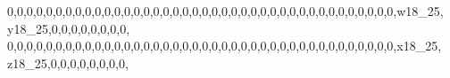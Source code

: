 \documentclass[]{article}
\newenvironment{Shaded}{\begin{snugshade}}{\end{snugshade}}
\newcommand{\DecValTok}[1]{\textcolor[rgb]{0.00,0.00,0.81}{#1}}
\newcommand{\NormalTok}[1]{#1}
\begin{document}
\begin{Shaded}
\begin{Highlighting}[]
\DecValTok{0}\NormalTok{,}\DecValTok{0}\NormalTok{,}\DecValTok{0}\NormalTok{,}\DecValTok{0}\NormalTok{,}\DecValTok{0}\NormalTok{,}\DecValTok{0}\NormalTok{,}\DecValTok{0}\NormalTok{,}\DecValTok{0}\NormalTok{,}\DecValTok{0}\NormalTok{,}\DecValTok{0}\NormalTok{,}\DecValTok{0}\NormalTok{,}\DecValTok{0}\NormalTok{,}\DecValTok{0}\NormalTok{,}\DecValTok{0}\NormalTok{,}\DecValTok{0}\NormalTok{,}\DecValTok{0}\NormalTok{,}\DecValTok{0}\NormalTok{,}\DecValTok{0}\NormalTok{,}\DecValTok{0}\NormalTok{,}\DecValTok{0}\NormalTok{,}\DecValTok{0}\NormalTok{,}\DecValTok{0}\NormalTok{,}\DecValTok{0}\NormalTok{,}\DecValTok{0}\NormalTok{,}\DecValTok{0}\NormalTok{,}\DecValTok{0}\NormalTok{,}\DecValTok{0}\NormalTok{,}\DecValTok{0}\NormalTok{,}\DecValTok{0}\NormalTok{,}\DecValTok{0}\NormalTok{,}\DecValTok{0}\NormalTok{,}\DecValTok{0}\NormalTok{,}\DecValTok{0}\NormalTok{,}\DecValTok{0}\NormalTok{,}\DecValTok{0}\NormalTok{,}\DecValTok{0}\NormalTok{,}\DecValTok{0}\NormalTok{,}\DecValTok{0}\NormalTok{,}\DecValTok{0}\NormalTok{,}\DecValTok{0}\NormalTok{,w18_}\DecValTok{25}\NormalTok{, y18_}\DecValTok{25}\NormalTok{,}\DecValTok{0}\NormalTok{,}\DecValTok{0}\NormalTok{,}\DecValTok{0}\NormalTok{,}\DecValTok{0}\NormalTok{,}\DecValTok{0}\NormalTok{,}\DecValTok{0}\NormalTok{,}\DecValTok{0}\NormalTok{,}\DecValTok{0}\NormalTok{,}
\DecValTok{0}\NormalTok{,}\DecValTok{0}\NormalTok{,}\DecValTok{0}\NormalTok{,}\DecValTok{0}\NormalTok{,}\DecValTok{0}\NormalTok{,}\DecValTok{0}\NormalTok{,}\DecValTok{0}\NormalTok{,}\DecValTok{0}\NormalTok{,}\DecValTok{0}\NormalTok{,}\DecValTok{0}\NormalTok{,}\DecValTok{0}\NormalTok{,}\DecValTok{0}\NormalTok{,}\DecValTok{0}\NormalTok{,}\DecValTok{0}\NormalTok{,}\DecValTok{0}\NormalTok{,}\DecValTok{0}\NormalTok{,}\DecValTok{0}\NormalTok{,}\DecValTok{0}\NormalTok{,}\DecValTok{0}\NormalTok{,}\DecValTok{0}\NormalTok{,}\DecValTok{0}\NormalTok{,}\DecValTok{0}\NormalTok{,}\DecValTok{0}\NormalTok{,}\DecValTok{0}\NormalTok{,}\DecValTok{0}\NormalTok{,}\DecValTok{0}\NormalTok{,}\DecValTok{0}\NormalTok{,}\DecValTok{0}\NormalTok{,}\DecValTok{0}\NormalTok{,}\DecValTok{0}\NormalTok{,}\DecValTok{0}\NormalTok{,}\DecValTok{0}\NormalTok{,}\DecValTok{0}\NormalTok{,}\DecValTok{0}\NormalTok{,}\DecValTok{0}\NormalTok{,}\DecValTok{0}\NormalTok{,}\DecValTok{0}\NormalTok{,}\DecValTok{0}\NormalTok{,}\DecValTok{0}\NormalTok{,}\DecValTok{0}\NormalTok{,x18_}\DecValTok{25}\NormalTok{, z18_}\DecValTok{25}\NormalTok{,}\DecValTok{0}\NormalTok{,}\DecValTok{0}\NormalTok{,}\DecValTok{0}\NormalTok{,}\DecValTok{0}\NormalTok{,}\DecValTok{0}\NormalTok{,}\DecValTok{0}\NormalTok{,}\DecValTok{0}\NormalTok{,}\DecValTok{0}\NormalTok{,}

\end{Highlighting}
\end{Shaded}
\end{document}

